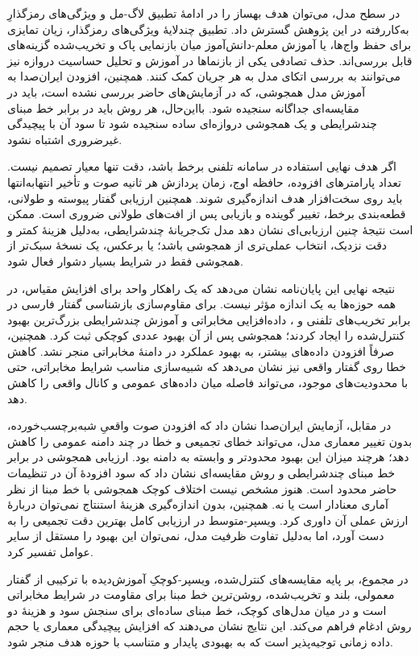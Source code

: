 در سطح مدل، می‌توان هدف بهساز را در ادامهٔ تطبیق لاگ-مل و ویژگی‌های رمزگذارِ به‌کاررفته در این پژوهش گسترش داد. تطبیق چندلایهٔ ویژگی‌های رمزگذار، زیان تمایزی برای حفظ واج‌ها، یا آموزش معلم-دانش‌آموز میان بازنمایی پاک و تخریب‌شده گزینه‌های قابل بررسی‌اند. حذف تصادفی یکی از بازنماها در آموزش و تحلیل حساسیت دروازه نیز می‌توانند به بررسی اتکای مدل به هر جریان کمک کنند. همچنین، افزودن ایران‌صدا به آموزش مدل همجوشی، که در آزمایش‌های حاضر بررسی نشده است، باید در مقایسه‌ای جداگانه سنجیده شود. بااین‌حال، هر روش باید در برابر خط مبنای چندشرایطی و یک همجوشی دروازه‌ای ساده سنجیده شود تا سود آن با پیچیدگی غیرضروری اشتباه نشود.


اگر هدف نهایی استفاده در سامانه تلفنی برخط باشد، دقت تنها معیار تصمیم نیست. تعداد پارامترهای افزوده، حافظه اوج، زمان پردازش هر ثانیه صوت و تأخیر انتهابه‌انتها باید روی سخت‌افزار هدف اندازه‌گیری شوند. همچنین ارزیابی گفتار پیوسته و طولانی، قطعه‌بندی برخط، تغییر گوینده و بازیابی پس از افت‌های طولانی ضروری است. ممکن است نتیجهٔ چنین ارزیابی‌ای نشان دهد مدل تک‌جریانهٔ چندشرایطی، به‌دلیل هزینهٔ کمتر و دقت نزدیک، انتخاب عملی‌تری از همجوشی باشد؛ یا برعکس، یک نسخهٔ سبک‌تر از همجوشی فقط در شرایط بسیار دشوار فعال شود.


نتیجه نهایی این پایان‌نامه نشان می‌دهد که یک راهکار واحد برای افزایش مقیاس، در همه حوزه‌ها به یک اندازه مؤثر نیست. برای مقاوم‌سازی بازشناسی گفتار فارسی در برابر تخریب‌های تلفنی و ، داده‌افزایی مخابراتی و آموزش چندشرایطی بزرگ‌ترین بهبود کنترل‌شده را ایجاد کردند؛ همجوشی پس از آن بهبود عددی کوچکی ثبت کرد. همچنین، صرفاً افزودن داده‌های بیشتر، به بهبود عملکرد در دامنهٔ مخابراتی منجر نشد. کاهش خطا روی گفتار واقعی  نیز نشان می‌دهد که شبیه‌سازی مناسب شرایط مخابراتی، حتی با محدودیت‌های موجود، می‌تواند فاصله میان داده‌های عمومی و کانال واقعی را کاهش دهد.

در مقابل، آزمایش ایران‌صدا نشان داد که افزودن صوت واقعیِ شبه‌برچسب‌خورده، بدون تغییر معماری مدل، می‌تواند خطای تجمیعی و خطا در چند دامنه عمومی را کاهش دهد؛ هرچند میزان این بهبود محدودتر و وابسته به دامنه بود. ارزیابی همجوشی در برابر خط مبنای چندشرایطی و روش مقایسه‌ای نشان داد که سود افزودهٔ آن در تنظیمات حاضر محدود است. هنوز مشخص نیست اختلاف کوچک همجوشی با خط مبنا از نظر آماری معنادار است یا نه. همچنین، بدون اندازه‌گیری هزینهٔ استنتاج نمی‌توان دربارهٔ ارزش عملی آن داوری کرد. ویسپر-متوسط در ارزیابی کامل بهترین دقت تجمیعی را به دست آورد، اما به‌دلیل تفاوت ظرفیت مدل، نمی‌توان این بهبود را مستقل از سایر عوامل تفسیر کرد.

در مجموع، بر پایه مقایسه‌های کنترل‌شده، ویسپر-کوچکِ آموزش‌دیده با ترکیبی از گفتار معمولی، بلند و تخریب‌شده، روشن‌ترین خط مبنا برای مقاومت در شرایط مخابراتی است و در میان مدل‌های کوچک، خط مبنای ساده‌ای برای سنجش سود و هزینهٔ دو روش ادغام فراهم می‌کند. این نتایج نشان می‌دهند که افزایش پیچیدگی معماری یا حجم داده زمانی توجیه‌پذیر است که به بهبودی پایدار و متناسب با حوزه هدف منجر شود.

